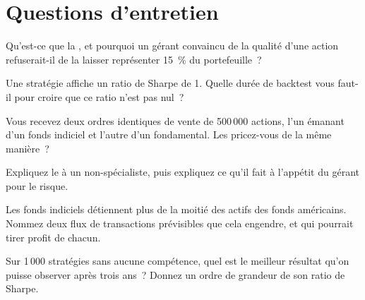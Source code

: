 \section{Questions d'entretien}

\begin{interviewq}\label{iq:m1:the-buy-side:1}
Qu'est-ce que la , et pourquoi un gérant convaincu de la qualité d'une action refuserait-il
de la laisser représenter 15~\% du portefeuille~?
\end{interviewq}

\begin{interviewq}\label{iq:m1:the-buy-side:2}
Une stratégie affiche un ratio de Sharpe de 1. Quelle durée de backtest vous faut-il
pour croire que ce ratio n'est pas nul~?
\end{interviewq}

\begin{interviewq}\label{iq:m1:the-buy-side:3}
Vous recevez deux ordres identiques de vente de 500\,000 actions, l'un émanant
d'un fonds indiciel et l'autre d'un  fondamental. Les pricez-vous de la même manière~?
\end{interviewq}

\begin{interviewq}\label{iq:m1:the-buy-side:4}
Expliquez le  à un non-spécialiste, puis expliquez ce qu'il fait
à l'appétit du gérant pour le risque.
\end{interviewq}

\begin{interviewq}\label{iq:m1:the-buy-side:5}
Les fonds indiciels détiennent plus de la moitié des actifs des fonds américains. Nommez deux
flux de transactions prévisibles que cela engendre, et qui pourrait tirer profit de chacun.
\end{interviewq}

\begin{interviewq}\label{iq:m1:the-buy-side:6}
Sur 1\,000 stratégies sans aucune compétence, quel est le meilleur résultat qu'on puisse observer
après trois ans~? Donnez un ordre de grandeur de son ratio de Sharpe.
\end{interviewq}
